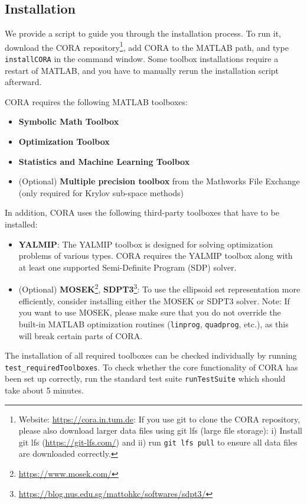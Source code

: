 \subsection{Installation}\label{sec:installation}

We provide a script to guide you through the installation process.
To run it,
download the CORA repository\footnote{Website: \url{https://cora.in.tum.de}:
If you use git to clone the CORA repository, please also download larger data files using git lfs (large file storage):
i) Install git lfs (\url{https://git-lfs.com/}) and ii) run \texttt{\small git lfs pull} to ensure all data files are downloaded correctly.},
add CORA to the MATLAB path, and type \texttt{installCORA} in the command window.
Some toolbox installations require a restart of MATLAB, and you have to manually rerun the installation script afterward.

CORA requires the following MATLAB toolboxes:
\begin{itemize}
	\item \textbf{Symbolic Math Toolbox}
	\item \textbf{Optimization Toolbox}
	\item \textbf{Statistics and Machine Learning Toolbox}
	\item (Optional) \textbf{Multiple precision toolbox} from the Mathworks File Exchange (only required for Krylov sub-space methods)
\end{itemize}

In addition, CORA uses the following third-party toolboxes that have to be installed:
\begin{itemize}
	\item \textbf{YALMIP}: The YALMIP toolbox \cite{Lofberg2004} is designed for solving optimization problems of various types.
		CORA requires the YALMIP toolbox along with at least one supported Semi-Definite Program (SDP) solver.
	\item (Optional) \textbf{MOSEK}\footnote{\url{https://www.mosek.com/}}, \textbf{SDPT3}\footnote{\url{https://blog.nus.edu.sg/mattohkc/softwares/sdpt3/}}: To use the ellipsoid set representation more efficiently, consider installing either the MOSEK or SDPT3 solver. Note: If you want to use MOSEK, please make sure that you do not override the built-in MATLAB optimization routines (\texttt{linprog}, \texttt{quadprog}, etc.), as this will break certain parts of CORA.
\end{itemize}

The installation of all required toolboxes can be checked individually by running \newline \texttt{test\_requiredToolboxes}.
To check whether the core functionality of CORA has been set up correctly, run the standard test suite \texttt{runTestSuite} which should take about 5 minutes.

